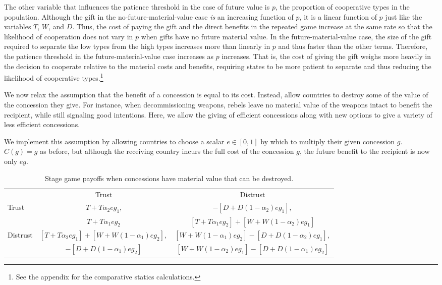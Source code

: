 \documentclass[bibtex,autowc]{apsr_submission}
\begin{document}
The other variable that influences the patience threshold in the case of future value is $p$, the proportion of cooperative types in the population. Although the gift in the no-future-material-value case \emph{is} an increasing function of $p$, it is a linear function of $p$ just like the variables $T$, $W$, and $D$. Thus, the cost of paying the gift and the direct benefits in the repeated game increase at the same rate so that the likelihood of cooperation does not vary in $p$ when gifts have no future material value. In the future-material-value case, the size of the gift required to separate the low types from the high types increases more than linearly in $p$ and thus faster than the other terms. Therefore, the patience threshold in the future-material-value case increases as $p$ increases. That is, the cost of giving the gift weighs more heavily in the decision to cooperate relative to the material costs and benefits, requiring states to be more patient to separate and thus reducing the likelihood of cooperative types.\footnote{See the appendix for the comparative statics calculations.} 

We now relax the assumption that the benefit of a concession is equal to its cost. Instead, allow countries to destroy some of the value of the concession they give. For instance, when decommissioning weapons, rebels leave no material value of the weapons intact to benefit the recipient, while still signaling good intentions. Here, we allow the giving of efficient concessions along with new options to give a variety of less efficient concessions. 

We implement this assumption by allowing countries to choose a scalar $e \in[0,1]$ by which to multiply their given concession $g$. $C(g)= g$ as before, but although the receiving country incurs the full cost of the concession $g$, the future benefit to the recipient is now only $eg$.


\begin{table}[hbt!]
    \centering
    \caption{Stage game payoffs when concessions have material value that can be destroyed.}
\begin{tabular}{l|c|c}\label{tab-3}
       & Trust & Distrust \\ 
	 Trust& \small$T+T\alpha_2 e g_1$, & \small$-[D+D(1-\alpha_2) eg_1],$ \\
  & \small$T+T\alpha_1 eg_2$ & \small$[T+T\alpha_1 eg_2] + [W+W(1-\alpha_2) eg_1] $\\  \hline
	Distrust & \small$[T+T\alpha_2 eg_1]+[W+W(1-\alpha_1) eg_2],$& \small$[W+W(1-\alpha_1) eg_2]-[D+D(1-\alpha_2) eg_1],$ \\
	 & \small$-[D+D(1-\alpha_1) eg_2] $ & \small$[W+W(1-\alpha_2) eg_1]-[D+D(1-\alpha_1) eg_2]$
  \end{tabular}
\end{table}
\end{document}

